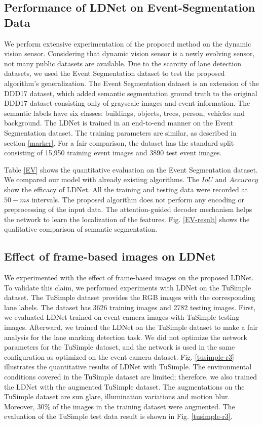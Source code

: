 \documentclass[journal]{IEEEtran}
\begin{document}
\subsection{Performance of LDNet on Event-Segmentation Data}
We perform extensive experimentation of the proposed method on the dynamic vision sensor. Considering that dynamic vision sensor is a newly evolving sensor, not many public datasets are available. Due to the scarcity of lane detection datasets, we used 
the Event Segmentation dataset
 \cite{EVnet} to test the proposed algorithm's generalization. The Event Segmentation dataset is an extension of the DDD17 dataset\cite{24}, which added semantic segmentation ground truth to the original DDD17 dataset consisting only of grayscale images and event information. The semantic labels have six classes: buildings, objects, trees, person, vehicles and background. The LDNet is trained in an end-to-end manner on the Event Segmentation dataset. The training parameters are similar, as described in section \ref{marker}. For a fair comparison, the dataset has the standard split consisting of 15,950 training event images and 3890 test event images.
\par
Table \ref{EV} shows the quantitative evaluation on the Event Segmentation dataset. We compared our model with already existing algorithms. The $IoU$ and $Accuracy$ show the efficacy of LDNet. All the training and testing data were recorded at $50-ms$ intervals. The proposed algorithm does not perform any encoding or preprocessing of the input data. The attention-guided decoder mechanism helps the network to learn the localization of the features. Fig. \ref{EV-result} shows the qualitative comparison of semantic segmentation.   

\subsection{ Effect of frame-based images on LDNet}
We experimented with the effect of frame-based images on the proposed LDNet. To validate this claim, we performed experiments with LDNet on the TuSimple dataset. The TuSimple dataset provides the RGB images with the corresponding lane labels. The dataset has 3626 training images and 2782 testing images. 
First, we evaluated LDNet trained on event camera images with TuSimple testing images. Afterward,  
we trained the LDNet on the TuSimple dataset to make a fair analysis for the lane marking detection task. We did not optimize the network parameters for the TuSimple dataset, and the network is used in the same configuration as optimized on the event camera dataset.  Fig. \ref{tusimple-r3} illustrates the quantitative results of LDNet with TuSimple. The environmental conditions covered in the TuSimple dataset are limited; therefore, we also trained the LDNet with the augmented TuSimple dataset. The augmentations on the TuSimple dataset are sun glare, illumination variations and motion blur. Moreover, $30\%$ of the images in the training dataset were augmented. The evaluation of the TuSimple test data result is shown in Fig. \ref{tusimple-r3}.
\end{document}
